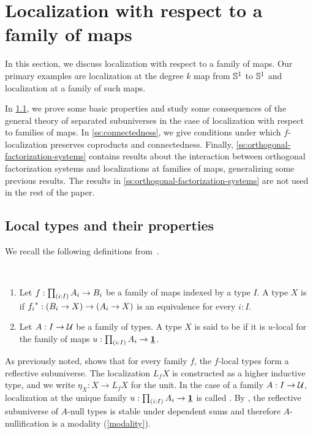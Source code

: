 \section{Localization with respect to a family of maps}\label{section:localization}

In this section, we discuss localization with respect to a family of maps.
Our primary examples are localization at the degree $k$ map from $\mathbb{S}^{1}$ to $\mathbb{S}^{1}$
and localization at a family of such maps.

In \cref{ss:basic-properties}, we prove some basic properties and study some consequences
of the general theory of separated subuniverses in the case of localization with respect to families of maps.
In \cref{ss:connectedness}, we give conditions under which
$f$-localization preserves coproducts and connectedness.
Finally, \cref{ss:orthogonal-factorization-systems} contains results about the interaction between
orthogonal factorization systems and localizations at families of maps, generalizing some
previous results. The results in \cref{ss:orthogonal-factorization-systems} are not used in the rest
of the paper.

\subsection{Local types and their properties}\label{ss:basic-properties}

We recall the following definitions from~\cite{RijkeShulmanSpitters}.
\begin{defn}\ 
\begin{enumerate}
\item    Let $f: \prd{i:I} A_i \to B_i$ be a family of maps indexed by a type $I$.
    A type $X$ is \define{$f$-local} if
    ${f_i}^\ast : (B_i \to X) \to (A_i \to X)$ is an equivalence for every $i : I$.
\item Let $A:I\to\mathcal{U}$ be a family of types. A type $X$ is said to be \define{$A$-null} if it is $u$-local for the family of maps $u:\prd{i:I}A_i\to\unit$. 
\end{enumerate}
\end{defn} 

As previously noted, \cite[Theorem 2.16]{RijkeShulmanSpitters} shows that for every
family $f$, the $f$-local types form a reflective subuniverse.
The localization $L_f X$ is constructed as a higher inductive type,
and we write $\eta_X : X \to L_f X$ for the unit.
In the case of a family $A:I\to\mathcal{U}$, localization at the unique family $u:\prd{i:I}A_i \to \unit$ is called .
By \cite[Theorem 2.17]{RijkeShulmanSpitters}, the reflective subuniverse of $A$-null types is stable under dependent sums and therefore $A$-nullification is a modality (\cref{modality}).

